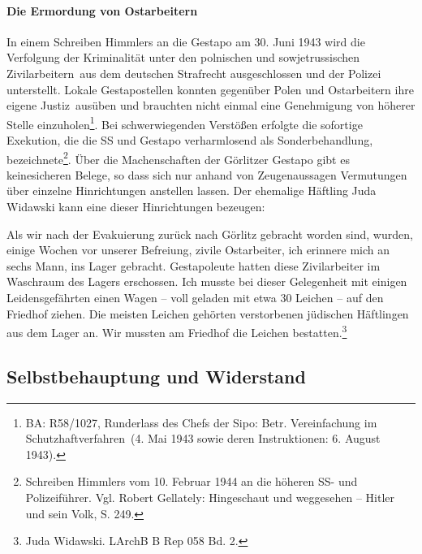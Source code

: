 \paragraph{Die Ermordung von Ostarbeitern}
In einem Schreiben Himmlers an die Gestapo am 30. Juni 1943 wird die \glqq Verfolgung der Kriminalität unter den polnischen und sowjetrussischen Zivilarbeitern\grqq~aus dem deutschen Strafrecht ausgeschlossen und der Polizei unterstellt. Lokale Gestapo\-stellen konnten gegenüber Polen und Ostarbeitern ihre eigene \glqq Justiz\grqq~ausüben und brauchten nicht einmal eine Genehmigung von höherer Stelle einzuholen\footnote{BA: R58/1027, Runderlass des Chefs der Sipo: Betr. \glqq Vereinfachung im Schutzhaftverfahren\grqq~(4. Mai 1943 sowie deren Instruktionen: 6. August 1943).}. Bei schwerwiegenden Verstößen erfolgte die sofortige Exekution, die die SS und Gestapo verharmlosend als \glqq Sonderbehandlung\grqq, bezeichnete\footnote{Schreiben Himmlers vom 10. Februar 1944 an die höheren SS- und Polizeiführer. Vgl. Robert Gellately: Hingeschaut und weggesehen -- Hitler und sein Volk, S. 249.}. Über die Machenschaften der Görlitzer Gestapo gibt es keine\linebreak\newpage sicheren Belege, so dass sich nur anhand von Zeugenaussagen Vermutungen über einzelne Hinrichtungen anstellen lassen. Der ehemalige Häftling Juda Widawski kann eine dieser Hinrichtungen bezeugen:
\begin{leftbar}
Als wir nach der Evakuierung zurück nach Görlitz gebracht worden sind, wurden, einige Wochen vor unserer Befreiung, zivile Ostarbeiter, ich erinnere mich an sechs Mann, ins Lager gebracht. Gestapoleute hatten diese Zivilarbeiter im Waschraum des Lagers erschossen. Ich musste bei dieser Gelegenheit mit einigen Leidensgefährten einen Wagen -- voll geladen mit etwa 30 Leichen -- auf den Friedhof ziehen. Die meisten Leichen gehörten verstorbenen jüdischen Häftlingen aus dem Lager an. Wir mussten am Friedhof die Leichen bestatten.\footnote{Juda Widawski. LArchB B Rep 058 Bd. 2.}
\end{leftbar}


\subsection{Selbstbehauptung und Widerstand}

